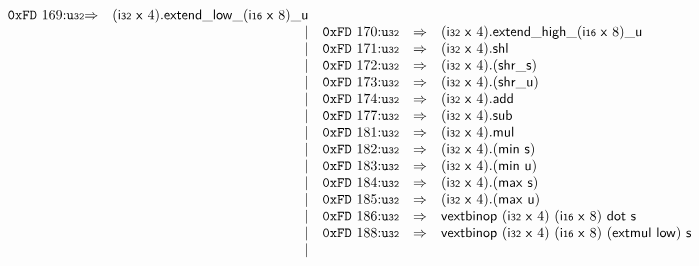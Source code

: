 $$\begin{array}{@{}l@{}rrlll@{}l@{}}
\mathtt{0xFD}~169{:}{\mathtt{u{\scriptstyle32}}} &\Rightarrow& (\mathsf{i{\scriptstyle32}}~\mathsf{x}~4) . {{{{{{\mathsf{extend}}{\mathsf{\_}}}{\mathsf{low}}}{\mathsf{\_}}}{(\mathsf{i{\scriptstyle16}}~\mathsf{x}~8)}}{\mathsf{\_}}}{\mathsf{u}} \\ &&|&
\mathtt{0xFD}~170{:}{\mathtt{u{\scriptstyle32}}} &\Rightarrow& (\mathsf{i{\scriptstyle32}}~\mathsf{x}~4) . {{{{{{\mathsf{extend}}{\mathsf{\_}}}{\mathsf{high}}}{\mathsf{\_}}}{(\mathsf{i{\scriptstyle16}}~\mathsf{x}~8)}}{\mathsf{\_}}}{\mathsf{u}} \\ &&|&
\mathtt{0xFD}~171{:}{\mathtt{u{\scriptstyle32}}} &\Rightarrow& (\mathsf{i{\scriptstyle32}}~\mathsf{x}~4) . \mathsf{shl} \\ &&|&
\mathtt{0xFD}~172{:}{\mathtt{u{\scriptstyle32}}} &\Rightarrow& (\mathsf{i{\scriptstyle32}}~\mathsf{x}~4) . ({\mathsf{shr\_}}{\mathsf{s}}) \\ &&|&
\mathtt{0xFD}~173{:}{\mathtt{u{\scriptstyle32}}} &\Rightarrow& (\mathsf{i{\scriptstyle32}}~\mathsf{x}~4) . ({\mathsf{shr\_}}{\mathsf{u}}) \\ &&|&
\mathtt{0xFD}~174{:}{\mathtt{u{\scriptstyle32}}} &\Rightarrow& (\mathsf{i{\scriptstyle32}}~\mathsf{x}~4) . \mathsf{add} \\ &&|&
\mathtt{0xFD}~177{:}{\mathtt{u{\scriptstyle32}}} &\Rightarrow& (\mathsf{i{\scriptstyle32}}~\mathsf{x}~4) . \mathsf{sub} \\ &&|&
\mathtt{0xFD}~181{:}{\mathtt{u{\scriptstyle32}}} &\Rightarrow& (\mathsf{i{\scriptstyle32}}~\mathsf{x}~4) . \mathsf{mul} \\ &&|&
\mathtt{0xFD}~182{:}{\mathtt{u{\scriptstyle32}}} &\Rightarrow& (\mathsf{i{\scriptstyle32}}~\mathsf{x}~4) . (\mathsf{min}~\mathsf{s}) \\ &&|&
\mathtt{0xFD}~183{:}{\mathtt{u{\scriptstyle32}}} &\Rightarrow& (\mathsf{i{\scriptstyle32}}~\mathsf{x}~4) . (\mathsf{min}~\mathsf{u}) \\ &&|&
\mathtt{0xFD}~184{:}{\mathtt{u{\scriptstyle32}}} &\Rightarrow& (\mathsf{i{\scriptstyle32}}~\mathsf{x}~4) . (\mathsf{max}~\mathsf{s}) \\ &&|&
\mathtt{0xFD}~185{:}{\mathtt{u{\scriptstyle32}}} &\Rightarrow& (\mathsf{i{\scriptstyle32}}~\mathsf{x}~4) . (\mathsf{max}~\mathsf{u}) \\ &&|&
\mathtt{0xFD}~186{:}{\mathtt{u{\scriptstyle32}}} &\Rightarrow& \mathsf{vextbinop}~(\mathsf{i{\scriptstyle32}}~\mathsf{x}~4)~(\mathsf{i{\scriptstyle16}}~\mathsf{x}~8)~\mathsf{dot}~\mathsf{s} \\ &&|&
\mathtt{0xFD}~188{:}{\mathtt{u{\scriptstyle32}}} &\Rightarrow& \mathsf{vextbinop}~(\mathsf{i{\scriptstyle32}}~\mathsf{x}~4)~(\mathsf{i{\scriptstyle16}}~\mathsf{x}~8)~(\mathsf{extmul}~\mathsf{low})~\mathsf{s} \\ &&|&

\end{array}$$
